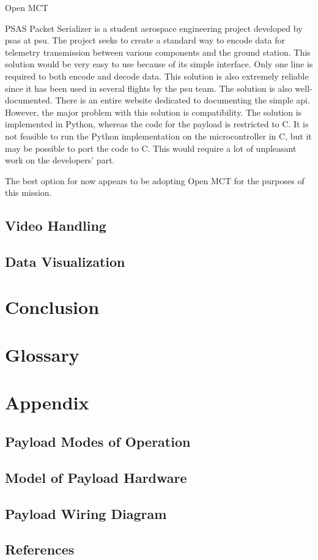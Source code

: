 \documentclass[letterpaper,10pt]{article}
\begin{document}
Open MCT

PSAS Packet Serializer is a student aerospace engineering project developed by \gls{psas} at \gls{psu}. 
The project seeks to create a standard way to encode data for telemetry transmission between various components
and the ground station.
This solution would be very easy to use because of its simple interface.
Only one line is required to both encode and decode data.
This solution is also extremely reliable since it has been used in several flights by the \gls{psu} team.
The solution is also well-documented.
There is an entire website dedicated to documenting the simple \gls{api}.
However, the major problem with this solution is compatibility.
The solution is implemented in Python, whereas the code for the \gls{payload} is restricted to C.
It is not feasible to run the Python implementation on the microcontroller in C,
but it may be possible to \gls{port} the code to C.
This would require a lot of unpleasant work on the developers' part.

The best option for now appears to be adopting Open MCT for the purposes of this mission.

\subsection{Video Handling}
\subsection{Data Visualization}

\section{Conclusion}
\section{Glossary}
\glsaddall
\printglossaries

\section{Appendix}
\subsection{Payload Modes of Operation}
\subsection{Model of Payload Hardware}
\subsection{Payload Wiring Diagram}
\subsection{References}
\end{document}
